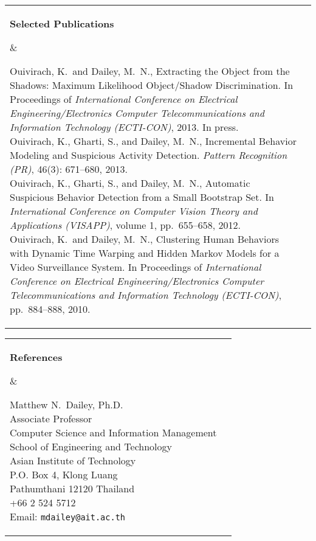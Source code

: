 \documentclass[11pt]{article}
\makeatletter
\newcommand{\mysection}[2]{
  \noindent
  \begin{tabular}{@{}ll@{}}
    \parbox[t]{1.0in}{ \raggedright \bf #1 } &
    \parbox[t]{5.0in}{ #2 }\\
    \hspace{0.2in}
  \end{tabular}
}
\makeatother
\begin{document}
\mysection{Selected Publications} {
  Ouivirach, K.\ and Dailey, M.\ N., Extracting the Object from the
  Shadows: Maximum Likelihood Object/Shadow Discrimination. In
  Proceedings of \textit{International Conference on Electrical
  Engineering/Electronics Computer Telecommunications and Information
  Technology (ECTI-CON)}, 2013. In press.\\

  Ouivirach, K., Gharti, S., and Dailey, M.\ N., Incremental Behavior
  Modeling and Suspicious Activity Detection. \textit{Pattern
  Recognition (PR)}, 46(3): 671--680, 2013.\\

  Ouivirach, K., Gharti, S., and Dailey, M.\ N., Automatic Suspicious
  Behavior Detection from a Small Bootstrap Set. In
  \textit{International Conference on Computer Vision Theory and 
  Applications (VISAPP)}, volume 1, pp.\ 655--658, 2012.\\

  Ouivirach, K.\ and Dailey, M.\ N., Clustering Human Behaviors with 
  Dynamic Time Warping and Hidden Markov Models for a Video Surveillance 
  System. In Proceedings of \textit{International Conference on 
  Electrical Engineering/Electronics Computer Telecommunications and 
  Information Technology (ECTI-CON)}, pp.\ 884--888, 2010.
}


\mysection{References}{
  Matthew N.\ Dailey, Ph.D.\\ 
  Associate Professor\\
  Computer Science and Information Management\\
  School of Engineering and Technology\\
  Asian Institute of Technology\\
  P.O. Box 4, Klong Luang\\
  Pathumthani 12120 Thailand\\
  +66 2 524 5712\\
  Email: {\tt mdailey@ait.ac.th}\\
}
\end{document}

